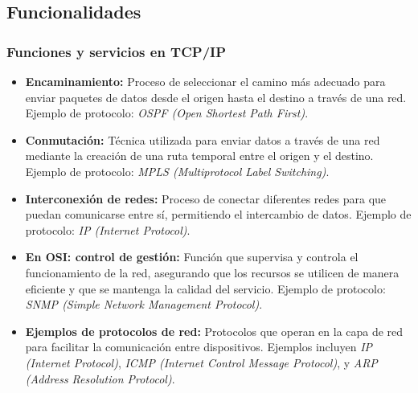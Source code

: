 \documentclass[a4paper,12pt]{article}
\begin{document}
\subsection{Funcionalidades}

\subsubsection{Funciones y servicios en TCP/IP}
\begin{itemize}
    \item \textbf{Encaminamiento:} Proceso de seleccionar el camino más adecuado para enviar paquetes de datos desde el origen hasta el destino a través de una red. Ejemplo de protocolo: \textit{OSPF (Open Shortest Path First)}.
    \item \textbf{Conmutación:} Técnica utilizada para enviar datos a través de una red mediante la creación de una ruta temporal entre el origen y el destino. Ejemplo de protocolo: \textit{MPLS (Multiprotocol Label Switching)}.
    \item \textbf{Interconexión de redes:} Proceso de conectar diferentes redes para que puedan comunicarse entre sí, permitiendo el intercambio de datos. Ejemplo de protocolo: \textit{IP (Internet Protocol)}.
    \item \textbf{En OSI: control de gestión:} Función que supervisa y controla el funcionamiento de la red, asegurando que los recursos se utilicen de manera eficiente y que se mantenga la calidad del servicio. Ejemplo de protocolo: \textit{SNMP (Simple Network Management Protocol)}.
    \item \textbf{Ejemplos de protocolos de red:} Protocolos que operan en la capa de red para facilitar la comunicación entre dispositivos. Ejemplos incluyen \textit{IP (Internet Protocol)}, \textit{ICMP (Internet Control Message Protocol)}, y \textit{ARP (Address Resolution Protocol)}.
\end{itemize}



\end{document}
